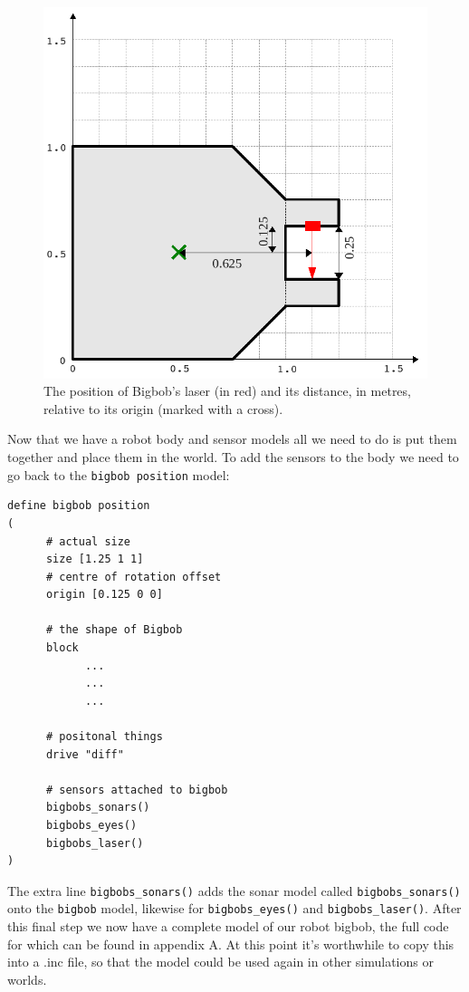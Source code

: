 \documentclass[a4paper]{report}
\begin{document}
\begin{figure}
	\centering
	\includegraphics[width=0.6\linewidth]{./pics/robot_building/bigbob_laser.png} 
	\caption{The position of Bigbob's laser (in red) and its distance, in metres, relative to its origin (marked with a cross).}
	\label{fig:BuildingAWorld:BuildingRobot:RobotSensors:Laser}
\end{figure}


Now that we have a robot body and sensor models all we need to do is put them together and place them in the world. To add the sensors to the body we need to go back to the \verb|bigbob position| model:
\begin{verbatim}
define bigbob position
(
      # actual size
      size [1.25 1 1]
      # centre of rotation offset
      origin [0.125 0 0]

      # the shape of Bigbob
      block
            ...
            ...
            ...
      
      # positonal things
      drive "diff"
      
      # sensors attached to bigbob
      bigbobs_sonars()
      bigbobs_eyes()
      bigbobs_laser()
)
\end{verbatim}
The extra line \verb|bigbobs_sonars()| adds the sonar model called \verb|bigbobs_sonars()| onto the \verb|bigbob| model, likewise for \verb|bigbobs_eyes()| and \verb|bigbobs_laser()|. After this final step we now have a complete model of our robot bigbob, the full code for which can be found in appendix A. At this point it's worthwhile to copy this into a .inc file, so that the model could be used again in other simulations or worlds.
\end{document}
